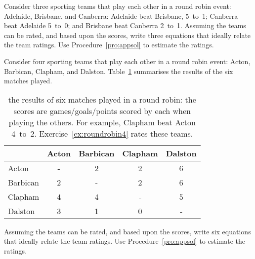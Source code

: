 \begin{exercise} \label{ex:} 
Consider three sporting teams that play each other in a round robin  event: Adelaide, Brisbane, and Canberra:
Adelaide beat Brisbane, 5~to~1;
Canberra beat Adelaide 5~to~0; and
Brisbane beat Canberra 2~to~1.
Assuming the teams can be rated, and  based upon the scores, write three equations that ideally relate the team ratings.  
Use Procedure~\ref{pro:appsol} to estimate the ratings.
\end{exercise}



\begin{exercise} \label{ex:roundrobin4} 
Consider four sporting teams that play each other in a round robin  event: Acton, Barbican, Clapham, and Dalston.
Table~\ref{tbl:roundrobin4} summarises the results of the six matches played.
\begin{table}
\caption{the results of six matches played in a round robin: the scores are games\slash goals\slash points scored by each when playing the others.  For example, Clapham beat Acton 4~to~2. Exercise~\ref{ex:roundrobin4} rates these teams.}
\label{tbl:roundrobin4}
\begin{center}
\begin{tabular}{l|cccc} \hline
&Acton& Barbican& Clapham& Dalston\\ \hline
Acton & - & 2 & 2 & 6 \\
Barbican & 2 & - & 2 & 6 \\
Clapham & 4 & 4 & - & 5 \\
Dalston & 3 & 1 & 0 & - \\ \hline
\end{tabular}
\end{center}
\end{table}%
Assuming the teams can be rated, and  based upon the scores, write six equations that ideally relate the team ratings.  
Use Procedure~\ref{pro:appsol} to estimate the ratings.
\end{exercise}




